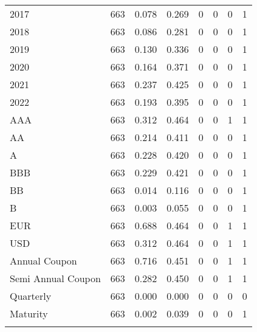 \begin{table}[!h]
\begin{tabular}{@{\extracolsep{5pt}}lccccccc}
2017 & 663 & 0.078 & 0.269 & 0 & 0 & 0 & 1 \\ 
2018 & 663 & 0.086 & 0.281 & 0 & 0 & 0 & 1 \\ 
2019 & 663 & 0.130 & 0.336 & 0 & 0 & 0 & 1 \\ 
2020 & 663 & 0.164 & 0.371 & 0 & 0 & 0 & 1 \\ 
2021 & 663 & 0.237 & 0.425 & 0 & 0 & 0 & 1 \\ 
2022 & 663 & 0.193 & 0.395 & 0 & 0 & 0 & 1 \\ 
AAA & 663 & 0.312 & 0.464 & 0 & 0 & 1 & 1 \\ 
AA & 663 & 0.214 & 0.411 & 0 & 0 & 0 & 1 \\ 
A & 663 & 0.228 & 0.420 & 0 & 0 & 0 & 1 \\ 
BBB & 663 & 0.229 & 0.421 & 0 & 0 & 0 & 1 \\ 
BB & 663 & 0.014 & 0.116 & 0 & 0 & 0 & 1 \\ 
B & 663 & 0.003 & 0.055 & 0 & 0 & 0 & 1 \\ 
EUR & 663 & 0.688 & 0.464 & 0 & 0 & 1 & 1 \\ 
USD & 663 & 0.312 & 0.464 & 0 & 0 & 1 & 1 \\ 
Annual Coupon & 663 & 0.716 & 0.451 & 0 & 0 & 1 & 1 \\ 
Semi Annual Coupon & 663 & 0.282 & 0.450 & 0 & 0 & 1 & 1 \\ 
Quarterly & 663 & 0.000 & 0.000 & 0 & 0 & 0 & 0 \\ 
Maturity & 663 & 0.002 & 0.039 & 0 & 0 & 0 & 1 \\
\hline \\[-1.8ex] 
\end{tabular} 
\end{table} 

\newpage

